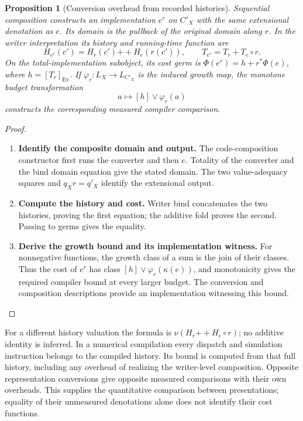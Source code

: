 \documentclass[11pt,a4paper]{article}
\numberwithin{algorithm}{section}
\numberwithin{equation}{section}
\newtheorem{proposition}[proposition]{Proposition}
\theoremstyle{definition}
\theoremstyle{remark}
\theoremstyle{plain}
\newcommand{\Ev}{{\operatorname{Ev}}}
\theoremstyle{definition}
\theoremstyle{plain}
\begin{document}
\begin{proposition}[Conversion overhead from recorded histories]
\label{prop:representation-overhead}
Sequential composition constructs an implementation $e^r$ on $C'_X$
with the same extensional denotation as $e$. Its domain is the
pullback of the original domain along $r$. In the writer
interpretation its history and running-time function are
\begin{equation}\label{eq:representation-overhead}
 H_{e^r}(c')=H_r(c'){+\!+}H_e(r(c')),
 \qquad T_{e^r}=T_r+T_e\circ r.
\end{equation}
On the total-implementation subobject, its cost germ is
$\Phi(e^r)=h+r^*\Phi(e)$, where
$h=[T_r]_{\Ev}$. If $\varphi_r:L_X\to L_{C'_X}$ is the induced growth map,
the monotone budget transformation
\[
 a\longmapsto[h]\vee\varphi_r(a)
\]
constructs the corresponding measured compiler comparison.
\end{proposition}
\begin{proof}\leavevmode
\begin{enumerate}[leftmargin=*,align=left]
\item \textbf{Identify the composite domain and output.}
The code-composition constructor first runs the converter and then $e$.
Totality of the converter and the bind domain equation give the stated
domain. The two value-adequacy squares and $q_Xr=q'_X$ identify the
extensional output.

\item \textbf{Compute the history and cost.}
Writer bind concatenates the two histories, proving
the first equation; the additive fold proves the second. Passing to
germs gives the equality.

\item \textbf{Derive the growth bound and its implementation witness.}
For nonnegative functions, the growth
class of a sum is the join of their classes. Thus the cost of $e^r$ has
class $[h]\vee\varphi_r(\kappa(e))$, and monotonicity gives the
required compiler bound at every larger budget. The conversion and
composition descriptions provide an implementation witnessing this bound.
\end{enumerate}
\end{proof}

For a different history valuation the formula is
$\nu(H_r{+\!+}H_e\circ r)$; no additive identity is inferred. In a
numerical compilation every dispatch and simulation instruction
belongs to the compiled history. Its bound is computed from that full
history, including any overhead of realizing the writer-level
composition. Opposite representation conversions give opposite measured
comparisons with their own overheads. This supplies the quantitative
comparison between presentations; equality of their unmeasured
denotations alone does not identify their cost functions.
\end{document}
